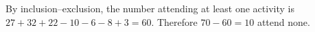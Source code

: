 By inclusion--exclusion, the number attending at least one activity is $27+32+22-10-6-8+3=60$. Therefore $70-60=\boxed{10}$ attend none.
